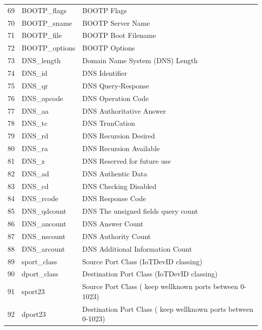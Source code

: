 \documentclass[journal]{IEEEtran}
\begin{document}
\begin{table}[htbp]
{\begin{tabular}{rll}
			\rowcolor[rgb]{ .851,  .851,  .851} 69    & BOOTP\_flags & BOOTP Flags \\
			70    & BOOTP\_sname & BOOTP Server Name \\
			\rowcolor[rgb]{ .851,  .851,  .851} 71    & BOOTP\_file & BOOTP  Boot Filename \\
			72    & BOOTP\_options & BOOTP Options \\
			\rowcolor[rgb]{ .851,  .851,  .851} 73    & DNS\_length & Domain Name System (DNS) Length \\
			74    & DNS\_id & DNS Identifier \\
			\rowcolor[rgb]{ .851,  .851,  .851} 75    & DNS\_qr & DNS Query-Response \\
			76    & DNS\_opcode & DNS Operation Code \\
			\rowcolor[rgb]{ .851,  .851,  .851} 77    & DNS\_aa & DNS Authoritative Answer \\
			78    & DNS\_tc & DNS TrunCation \\
			\rowcolor[rgb]{ .851,  .851,  .851} 79    & DNS\_rd & DNS Recursion Desired \\
			80    & DNS\_ra & DNS Recursion Available \\
			\rowcolor[rgb]{ .851,  .851,  .851} 81    & DNS\_z & DNS Reserved for future use \\
			82    & DNS\_ad & DNS Authentic Data \\
			\rowcolor[rgb]{ .851,  .851,  .851} 83    & DNS\_cd & DNS Checking Disabled \\
			84    & DNS\_rcode & DNS Response Code  \\
			\rowcolor[rgb]{ .851,  .851,  .851} 85    & DNS\_qdcount & DNS The unsigned fields query count \\
			86    & DNS\_ancount & DNS Answer Count \\
			\rowcolor[rgb]{ .851,  .851,  .851} 87    & DNS\_nscount & DNS  Authority Count \\
			88    & DNS\_arcount & DNS Additional Information Count \\
			\rowcolor[rgb]{ .851,  .851,  .851} 89    & sport\_class & Source Port Class (IoTDevID classing) \\
			90    & dport\_class & Destination Port Class  (IoTDevID classing) \\
			\rowcolor[rgb]{ .851,  .851,  .851} 91    & sport23 & Source Port Class ( keep wellknown ports between 0-1023) \\
			92    & dport23 & Destination Port Class ( keep wellknown ports between 0-1023) \\

\end{tabular}}
\end{table}
\end{document}
